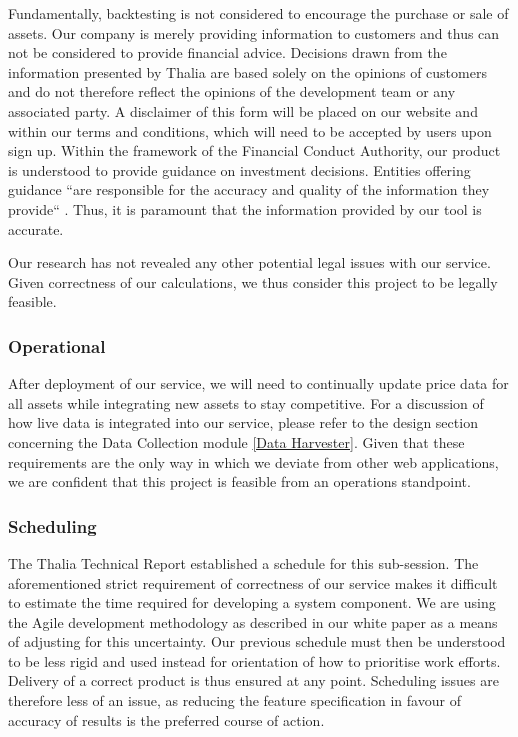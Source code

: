 \documentclass[main.tex]{subfiles}
\begin{document}
Fundamentally, backtesting is not considered to encourage the purchase or sale of assets. Our company is merely providing information to customers and thus can not be considered to provide financial advice. Decisions drawn from the information presented by Thalia are based solely on the opinions of customers and do not therefore reflect the opinions of the development team or any associated party. A disclaimer of this form will be placed on our website and within our terms and conditions, which will need to be accepted by users upon sign up.
Within the framework of the Financial Conduct Authority, our product is understood to provide guidance on investment decisions. Entities offering guidance ``are responsible for the accuracy and quality of the information they provide`` \cite{fca_guidance_advice}. Thus, it is paramount that the information provided by our tool is accurate.

Our research has not revealed any other potential legal issues with our service. Given correctness of our calculations, we thus consider this project to be legally feasible.

\subsubsection{Operational}

After deployment of our service, we will need to continually update price data for all assets while integrating new assets to stay competitive. For a discussion of how live data is integrated into our service, please refer to the design section concerning the Data Collection module \ref{Data Harvester}. Given that these requirements are the only way in which we deviate from other web applications, we are confident that this project is feasible from an operations standpoint.

\subsubsection{Scheduling}

The Thalia Technical Report established a schedule for this sub-session. The aforementioned strict requirement of correctness of our service makes it difficult to estimate the time required for developing a system component. We are using the Agile development methodology as described in our white paper \cite{WP} as a means of adjusting for this uncertainty. Our previous schedule must then be understood to be less rigid and used instead for orientation of how to prioritise work efforts. Delivery of a correct product is thus ensured at any point. Scheduling issues are therefore less of an issue, as reducing the feature specification in favour of accuracy of results is the preferred course of action.
\end{document}
